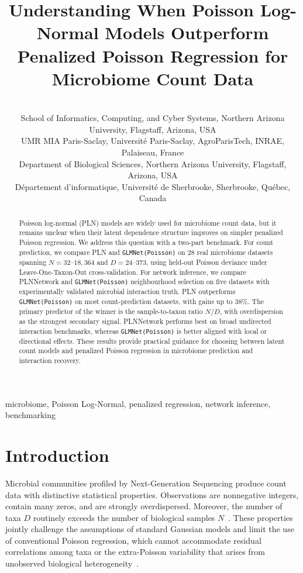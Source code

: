 \documentclass{jmlr}
\title[When Do PLN Models Beat Penalized Poisson Models?]{Understanding When Poisson Log-Normal Models Outperform Penalized Poisson Regression for Microbiome Count Data}
\author{%
  \Name{Daniel Agyapong} \Email{da2343@nau.edu}\\
  \addr School of Informatics, Computing, and Cyber Systems,
  Northern Arizona University, Flagstaff, Arizona, USA
  \AND
  \Name{Julien Chiquet} \Email{julien.chiquet@inrae.fr}\\
  \addr UMR MIA Paris-Saclay, Universit\'{e} Paris-Saclay,
  AgroParisTech, INRAE, Palaiseau, France
  \AND
  \Name{Jane Marks} \Email{jane.marks@nau.edu}\\
  \addr Department of Biological Sciences,
  Northern Arizona University, Flagstaff, Arizona, USA
  \AND
  \Name{Toby Dylan Hocking} \Email{toby.hocking@usherbrooke.ca}\\
  \addr D\'{e}partement d'informatique, Universit\'{e} de Sherbrooke,
  Sherbrooke, Qu\'{e}bec, Canada%
}
\begin{document}
\maketitle

\begin{abstract}
Poisson log-normal (PLN) models are widely used for microbiome count data, but it remains unclear when their latent dependence structure improves on simpler penalized Poisson regression.
We address this question with a two-part benchmark.
For count prediction, we compare PLN and \texttt{GLMNet(Poisson)} on 28 real microbiome datasets spanning $N = 32$--$18{,}364$ and $D = 24$--$373$, using held-out Poisson deviance under Leave-One-Taxon-Out cross-validation.
For network inference, we compare PLNNetwork and \texttt{GLMNet(Poisson)} neighbourhood selection on five datasets with experimentally validated microbial interaction truth.
PLN outperforms \texttt{GLMNet(Poisson)} on most count-prediction datasets, with gains up to 38\%.
The primary predictor of the winner is the sample-to-taxon ratio $N/D$, with overdispersion as the strongest secondary signal.
PLNNetwork performs best on broad undirected interaction benchmarks, whereas \texttt{GLMNet(Poisson)} is better aligned with local or directional effects.
These results provide practical guidance for choosing between latent count models and penalized Poisson regression in microbiome prediction and interaction recovery.
\end{abstract}

\begin{keywords}
microbiome, Poisson Log-Normal, penalized regression, network inference, benchmarking
\end{keywords}

\section{Introduction}
Microbial communities profiled by Next-Generation Sequencing produce count data with distinctive statistical properties.
Observations are nonnegative integers, contain many zeros, and are strongly overdispersed.   
Moreover, the number of taxa $D$ routinely exceeds the number of biological samples $N$~\cite{lagkouvardos2016imngs, Kodikara2022}.
These properties jointly challenge the assumptions of standard Gaussian models and limit the use of conventional Poisson regression, which cannot accommodate residual correlations among taxa or the extra-Poisson variability that arises from unobserved biological heterogeneity~\cite{mcmurdie2014waste, Chiquet2021}.
\end{document}

